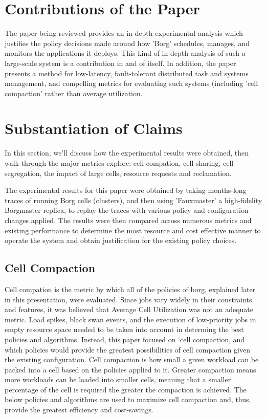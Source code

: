 \documentclass[runningheads,a4paper]{llncs}
\begin{document}
\section{Contributions of the Paper}
The paper being reviewed provides an in-depth experimental analysis which justifies the policy decisions made around how 'Borg' schedules, manages, and monitors the applications it deploys.  This kind of in-depth analysis of such a large-scale system is a contribution in and of itself.  In addition, the paper presents a method for low-latency, fault-tolerant distributed task and systems management, and compelling metrics for evaluating such systems (including 'cell compaction' rather than average utilization.

\section{Substantiation of Claims}
In this section, we'll discuss how the experimental results were obtained,  then walk through the major metrics explore: cell compation, cell sharing, cell segregation,  the impact of large cells, resource requests and reclamation.  

The experimental results for this paper were obtained by taking months-long traces of running Borg cells (clusters), and then using 'Fauxmaster' a high-fidelity Borgmaster replica, to replay the traces with various policy and configuration changes applied.  The results were then compared across numerous metrics and existing performance to determine the most resource and cost effective manner to operate the system and obtain justification for the existing policy choices. 

\subsection{Cell Compaction} 
Cell compation is the metric by which all of the policies of borg, explained later in this presentation, were evaluated.  Since jobs vary widely in their constraints and features, it was believed that Average Cell Utilization was not an adequate metric.  Load spikes, black swan events, and the execution of low-priority jobs in empty resource space needed to be taken into account in determing the best policies and algorithms.  Instead, this paper focused on ‘cell compaction, and which policies would provide the greatest possibilities of cell compaction given the existing configuration.  Cell compaction is how small a given workload can be packed into a cell based on the policies applied to it.  Greater compaction means more workloads can be loaded into smaller cells, meaning that a smaller percentage of the cell is required the greater the compaction is achieved.  The below policies and algorithms are used to maximize cell compaction and, thus, provide the greatest efficiency and cost-savings.
\end{document}
